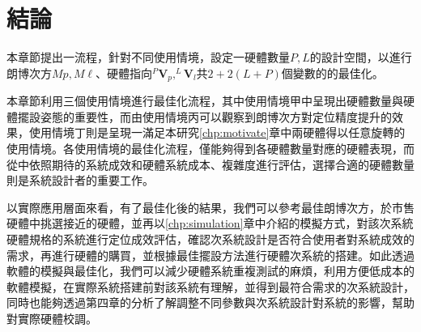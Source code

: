 

\section{結論}
\label{chp:5_conclu}

本章節提出一流程，針對不同使用情境，設定一硬體數量$P,L$的設計空間，以進行朗博次方$Mp,M\ell$、硬體指向$^{P}\boldsymbol{V}_p,^{L}\boldsymbol{V}_l$共$2+2(L+P)$個變數的的最佳化。


本章節利用三個使用情境進行最佳化流程，其中使用情境甲中呈現出硬體數量與硬體擺設姿態的重要性，而由使用情境丙可以觀察到朗博次方對定位精度提升的效果，使用情境丁則是呈現一滿足本研究\ref{chp:motivate}章中兩硬體得以任意旋轉的使用情境。各使用情境的最佳化流程，僅能夠得到各硬體數量對應的硬體表現，而從中依照期待的系統成效和硬體系統成本、複雜度進行評估，選擇合適的硬體數量則是系統設計者的重要工作。

以實際應用層面來看，有了最佳化後的結果，我們可以參考最佳朗博次方，於市售硬體中挑選接近的硬體，並再以\ref{chp:simulation}章中介紹的模擬方式，對該次系統硬體規格的系統進行定位成效評估，確認次系統設計是否符合使用者對系統成效的需求，再進行硬體的購買，並根據最佳擺設方法進行硬體次系統的搭建。如此透過軟體的模擬與最佳化，我們可以減少硬體系統重複測試的麻煩，利用方便低成本的軟體模擬，在實際系統搭建前對該系統有理解，並得到最符合需求的次系統設計，同時也能夠透過第四章的分析了解調整不同參數與次系統設計對系統的影響，幫助對實際硬體校調。













